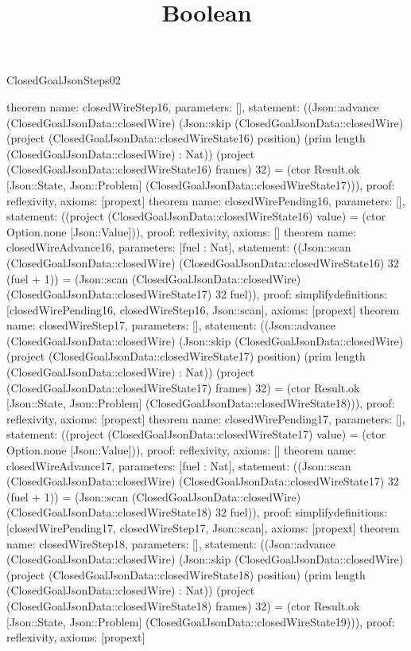 \begin{lexlean}{ClosedGoalJsonSteps02}
\title{Boolean}
\begin{semanticmodule}
theorem{
 name: closedWireStep16, parameters: [],
 statement: ((Json::advance (ClosedGoalJsonData::closedWire) (Json::skip (ClosedGoalJsonData::closedWire) (project (ClosedGoalJsonData::closedWireState16) position) (prim length (ClosedGoalJsonData::closedWire) : Nat)) (project (ClosedGoalJsonData::closedWireState16) frames) 32) = (ctor Result.ok [Json::State, Json::Problem] (ClosedGoalJsonData::closedWireState17))), proof: reflexivity{}, axioms: [propext]
}
theorem{
 name: closedWirePending16, parameters: [],
 statement: ((project (ClosedGoalJsonData::closedWireState16) value) = (ctor Option.none [Json::Value])), proof: reflexivity{}, axioms: []
}
theorem{
 name: closedWireAdvance16, parameters: [fuel : Nat],
 statement: ((Json::scan (ClosedGoalJsonData::closedWire) (ClosedGoalJsonData::closedWireState16) 32 (fuel + 1)) = (Json::scan (ClosedGoalJsonData::closedWire) (ClosedGoalJsonData::closedWireState17) 32 fuel)), proof: simplify{definitions: [closedWirePending16, closedWireStep16, Json::scan]}, axioms: [propext]
}
theorem{
 name: closedWireStep17, parameters: [],
 statement: ((Json::advance (ClosedGoalJsonData::closedWire) (Json::skip (ClosedGoalJsonData::closedWire) (project (ClosedGoalJsonData::closedWireState17) position) (prim length (ClosedGoalJsonData::closedWire) : Nat)) (project (ClosedGoalJsonData::closedWireState17) frames) 32) = (ctor Result.ok [Json::State, Json::Problem] (ClosedGoalJsonData::closedWireState18))), proof: reflexivity{}, axioms: [propext]
}
theorem{
 name: closedWirePending17, parameters: [],
 statement: ((project (ClosedGoalJsonData::closedWireState17) value) = (ctor Option.none [Json::Value])), proof: reflexivity{}, axioms: []
}
theorem{
 name: closedWireAdvance17, parameters: [fuel : Nat],
 statement: ((Json::scan (ClosedGoalJsonData::closedWire) (ClosedGoalJsonData::closedWireState17) 32 (fuel + 1)) = (Json::scan (ClosedGoalJsonData::closedWire) (ClosedGoalJsonData::closedWireState18) 32 fuel)), proof: simplify{definitions: [closedWirePending17, closedWireStep17, Json::scan]}, axioms: [propext]
}
theorem{
 name: closedWireStep18, parameters: [],
 statement: ((Json::advance (ClosedGoalJsonData::closedWire) (Json::skip (ClosedGoalJsonData::closedWire) (project (ClosedGoalJsonData::closedWireState18) position) (prim length (ClosedGoalJsonData::closedWire) : Nat)) (project (ClosedGoalJsonData::closedWireState18) frames) 32) = (ctor Result.ok [Json::State, Json::Problem] (ClosedGoalJsonData::closedWireState19))), proof: reflexivity{}, axioms: [propext]
}
\end{semanticmodule}
\end{lexlean}
